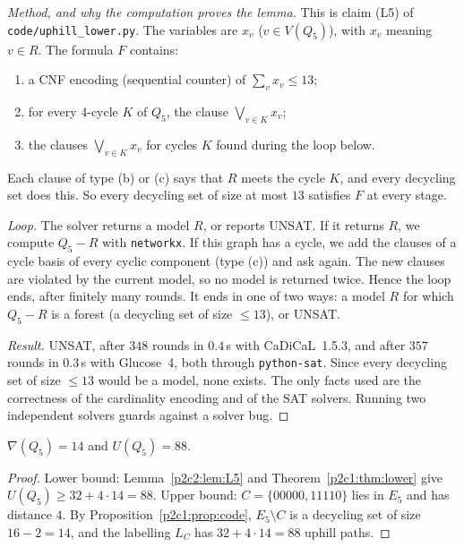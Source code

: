 \begin{proof}[Method, and why the computation proves the lemma]
This is claim (L5) of \texttt{code/uphill\_lower.py}. The variables are $x_v$ ($v\in V(Q_5)$),
with $x_v$ meaning $v\in R$. The formula $F$ contains:
\begin{enumerate}[label=(\alph*)]
\item a CNF encoding (sequential counter) of $\sum_vx_v\le13$;
\item for every $4$-cycle $K$ of $Q_5$, the clause $\bigvee_{v\in K}x_v$;
\item the clauses $\bigvee_{v\in K}x_v$ for cycles $K$ found during the loop below.
\end{enumerate}
Each clause of type (b) or (c) says that $R$ meets the cycle $K$, and every decycling set does
this. So every decycling set of size at most $13$ satisfies $F$ at every stage.

\emph{Loop.} The solver returns a model $R$, or reports UNSAT. If it returns $R$, we compute
$Q_5-R$ with \texttt{networkx}. If this graph has a cycle, we add the clauses of a cycle basis of
every cyclic component (type (c)) and ask again. The new clauses are violated by the current
model, so no model is returned twice. Hence the loop ends, after finitely many rounds. It ends in
one of two ways: a model $R$ for which $Q_5-R$ is a forest (a decycling set of size $\le13$), or
UNSAT.

\emph{Result.} UNSAT, after $348$ rounds in $0.4$\,s with CaDiCaL~1.5.3, and after $357$ rounds in
$0.3$\,s with Glucose~4, both through \texttt{python-sat}. Since every decycling set of size
$\le13$ would be a model, none exists. The only facts used are the correctness of the
cardinality encoding and of the SAT solvers. Running two independent solvers guards against a
solver bug.
\end{proof}

\begin{theorem}\label{p2c2:thm:main}
$\nabla(Q_5)=14$ and $U(Q_5)=88$.
\end{theorem}

\begin{proof}
Lower bound: Lemma~\ref{p2c2:lem:L5} and Theorem~\ref{p2c1:thm:lower} give
$U(Q_5)\ge32+4\cdot14=88$. Upper bound: $C=\{00000,11110\}$ lies in $E_5$ and has distance $4$.
By Proposition~\ref{p2c1:prop:code}, $E_5\setminus C$ is a decycling set of size $16-2=14$, and
the labelling $L_C$ has $32+4\cdot14=88$ uphill paths.
\end{proof}

